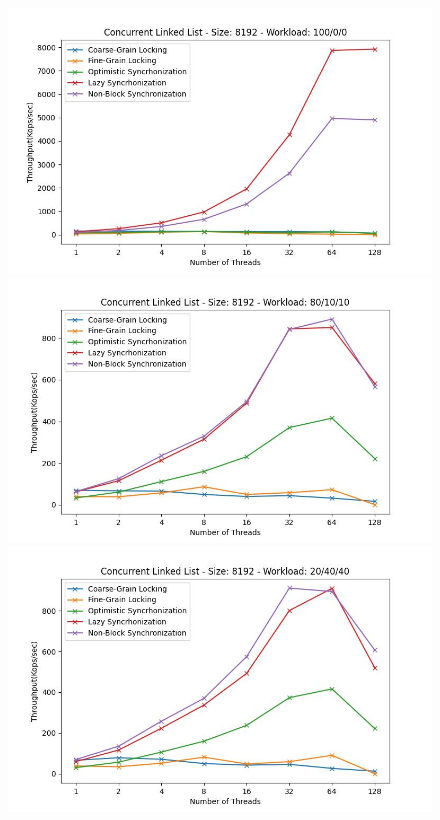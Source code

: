 \documentclass[../final_report.tex]{subfiles}
\begin{document}
\begin{figure}[H]
    \centering
        \includegraphics[scale=0.4]{outFiles/plots/concurrent_data_structs_all_8192_100_0_0.jpg}
        \includegraphics[scale=0.4]{outFiles/plots/concurrent_data_structs_all_8192_80_10_10.jpg}
        \includegraphics[scale=0.4]{outFiles/plots/concurrent_data_structs_all_8192_20_40_40.jpg}

\end{figure}
\end{document}
